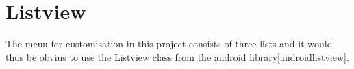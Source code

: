 \section{Listview}

The menu for customisation in this project consists of three lists and it would thus be obvius to use the Listview class from the android library\autoref{androidlistview}.
